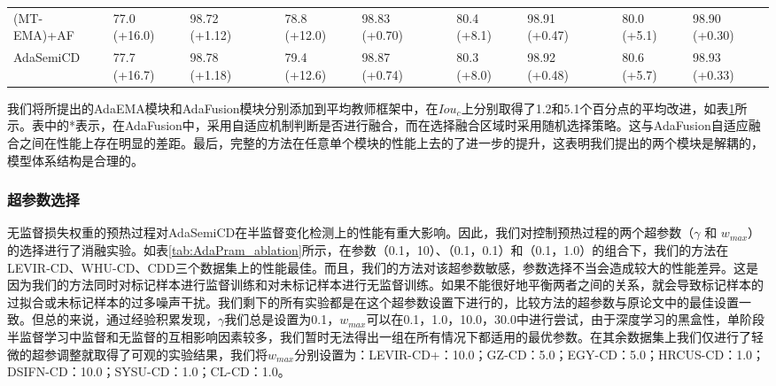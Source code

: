\documentclass[lang=chs, degree=master, blindreview=false, adobe=false]{yanputhesis}
\begin{document}
\begin{table}[ht]
{\begin{tabular}{p{30mm}p{20mm}p{20mm}cp{20mm}p{20mm}cp{20mm}p{20mm}cp{20mm}p{20mm}}
  (MT-EMA)+AF &   77.0 {\color{red} (+16.0)} & 98.72 {\color{red} (+1.12)} && %
                  78.8 {\color{red} (+12.0)} & 98.83 {\color{red} (+0.70)} && %
                80.4 {\color{red} (+8.1)} & 98.91 {\color{red} (+0.47)} && %
                  80.0 {\color{red} (+5.1)} & 98.90 {\color{red} (+0.30)} \\ %
      AdaSemiCD   &   77.7 {\color{red} (+16.7)} & 98.78 {\color{red} (+1.18)} &&
                  79.4 {\color{red} (+12.6)} & 98.87 {\color{red} (+0.74)} &&
                  80.3 {\color{red} (+8.0)} & 98.92 {\color{red} (+0.48)} &&
                  80.6 {\color{red} (+5.7)} & 98.93 {\color{red} (+0.33)} \\
  \bottomrule
\end{tabular}
  }
\label{tab:AdaModule_ablation}
\end{table}

我们将所提出的AdaEMA模块和AdaFusion模块分别添加到平均教师框架中，在$Iou_c$上分别取得了1.2和5.1个百分点的平均改进，如表\ref{tab:AdaModule_ablation}所示。表中的*表示，在AdaFusion中，采用自适应机制判断是否进行融合，而在选择融合区域时采用随机选择策略。这与AdaFusion自适应融合之间在性能上存在明显的差距。最后，完整的方法在任意单个模块的性能上去的了进一步的提升，这表明我们提出的两个模块是解耦的，模型体系结构是合理的。

\subsubsection{超参数选择}
无监督损失权重的预热过程对AdaSemiCD在半监督变化检测上的性能有重大影响。因此，我们对控制预热过程的两个超参数（$\gamma$ 和 $w_{max}$） 的选择进行了消融实验。如表\ref{tab:AdaPram_ablation}所示，在参数（0.1，10）、（0.1，0.1）和（0.1，1.0）的组合下，我们的方法在LEVIR-CD、WHU-CD、CDD三个数据集上的性能最佳。而且，我们的方法对该超参数敏感，参数选择不当会造成较大的性能差异。这是因为我们的方法同时对标记样本进行监督训练和对未标记样本进行无监督训练。如果不能很好地平衡两者之间的关系，就会导致标记样本的过拟合或未标记样本的过多噪声干扰。我们剩下的所有实验都是在这个超参数设置下进行的，比较方法的超参数与原论文中的最佳设置一致。但总的来说，通过经验积累发现，$\gamma$我们总是设置为0.1，$w_{max}$可以在{0.1，1.0，10.0，30.0}中进行尝试，由于深度学习的黑盒性，单阶段半监督学习中监督和无监督的互相影响因素较多，我们暂时无法得出一组在所有情况下都适用的最优参数。在其余数据集上我们仅进行了轻微的超参调整就取得了可观的实验结果，我们将$w_{max}$分别设置为：LEVIR-CD+：10.0；GZ-CD：5.0；EGY-CD：5.0；HRCUS-CD：1.0；DSIFN-CD：10.0；SYSU-CD：1.0；CL-CD：1.0。
\end{document}
